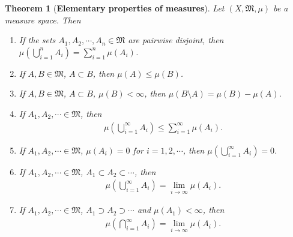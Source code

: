 \documentclass[11pt]{book}
\newtheorem{theorem}{Theorem}[chapter]
\theoremstyle{definition}
\numberwithin{equation}{chapter}
\def\MM{\mathfrak{M}}
\begin{document}
\begin{theorem}[{\bf Elementary properties of measures}]\label{theorem_16}
Let $(X, \MM, \mu)$ be a measure space. Then
\begin{enumerate}[label=(\alph*)]
    \item If the sets $A_1, A_2, \cdots, A_n \in \MM$ are pairwise disjoint, then $\mu \left(\bigcup^n_{i=1} A_i \right) = \sum^n_{i=1} \mu(A_i)$.
    
    \item If $A, B \in \MM$, $A \subset B$, then $\mu(A) \leq \mu(B)$.
    
    \item If $A, B \in \MM$, $A \subset B$, $\mu(B) < \infty$, then $\mu(B\setminus A) = \mu(B) - \mu(A)$.
    
    \item If $A_1, A_2, \cdots \in \MM$, then 
    \begin{align*}
        \mu \left(\bigcup^\infty_{i=1} A_i \right) \leq \sum^\infty_{i=1} \mu(A_i).
    \end{align*}
    
    \item If $A_1, A_2, \cdots \in \MM$, $\mu(A_i) = 0$ for $i = 1,2,\cdots$, then $\mu \left(\bigcup^\infty_{i=1} A_i \right) = 0$.
    
    \item If $A_1, A_2, \cdots \in \MM$, $A_1 \subset A_2 \subset \cdots$, then
    \begin{align*}
        \mu \left(\bigcup^\infty_{i=1} A_i \right) = \lim_{i\to\infty} \mu(A_i).
    \end{align*}
    
    \item If $A_1, A_2, \cdots \in \MM$, $A_1 \supset A_2 \supset \cdots$ and $\mu(A_1) < \infty$, then
    \begin{align*}
        \mu \left(\bigcap^\infty_{i=1} A_i \right) = \lim_{i\to\infty} \mu(A_i).
    \end{align*}
\end{enumerate}
\end{theorem}
\end{document}
